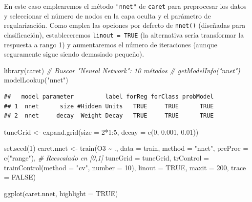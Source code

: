 \documentclass[
]{book}
\newenvironment{Shaded}{\begin{snugshade}}{\end{snugshade}}
\newcommand{\AttributeTok}[1]{\textcolor[rgb]{0.77,0.63,0.00}{#1}}
\newcommand{\CommentTok}[1]{\textcolor[rgb]{0.56,0.35,0.01}{\textit{#1}}}
\newcommand{\ConstantTok}[1]{\textcolor[rgb]{0.00,0.00,0.00}{#1}}
\newcommand{\DecValTok}[1]{\textcolor[rgb]{0.00,0.00,0.81}{#1}}
\newcommand{\FloatTok}[1]{\textcolor[rgb]{0.00,0.00,0.81}{#1}}
\newcommand{\FunctionTok}[1]{\textcolor[rgb]{0.00,0.00,0.00}{#1}}
\newcommand{\NormalTok}[1]{#1}
\newcommand{\OtherTok}[1]{\textcolor[rgb]{0.56,0.35,0.01}{#1}}
\newcommand{\SpecialCharTok}[1]{\textcolor[rgb]{0.00,0.00,0.00}{#1}}
\newcommand{\StringTok}[1]{\textcolor[rgb]{0.31,0.60,0.02}{#1}}
\theoremstyle{break}
\theoremstyle{definition}
\theoremstyle{definition}
\theoremstyle{definition}
\theoremstyle{definition}
\theoremstyle{remark}
\begin{document}
En este caso emplearemos el método \texttt{"nnet"} de \texttt{caret} para preprocesar los datos y seleccionar el número de nodos en la capa oculta y el parámetro de regularización.
Como emplea las opciones por defecto de \texttt{nnet()} (diseñadas para clasificación),
estableceremos \texttt{linout\ =\ TRUE} (la alternativa sería transformar la respuesta a rango 1) y aumentaremos el número de iteraciones (aunque seguramente sigue siendo demasiado pequeño).

\begin{Shaded}
\begin{Highlighting}[]
\FunctionTok{library}\NormalTok{(caret)}
\CommentTok{\# Buscar "Neural Network": 10 métodos}
\CommentTok{\# getModelInfo("nnet")}
\FunctionTok{modelLookup}\NormalTok{(}\StringTok{"nnet"}\NormalTok{)}
\end{Highlighting}
\end{Shaded}

\begin{verbatim}
##   model parameter         label forReg forClass probModel
## 1  nnet      size #Hidden Units   TRUE     TRUE      TRUE
## 2  nnet     decay  Weight Decay   TRUE     TRUE      TRUE
\end{verbatim}

\begin{Shaded}
\begin{Highlighting}[]
\NormalTok{tuneGrid }\OtherTok{\textless{}{-}} \FunctionTok{expand.grid}\NormalTok{(}\AttributeTok{size =} \DecValTok{2}\SpecialCharTok{*}\DecValTok{1}\SpecialCharTok{:}\DecValTok{5}\NormalTok{, }\AttributeTok{decay =} \FunctionTok{c}\NormalTok{(}\DecValTok{0}\NormalTok{, }\FloatTok{0.001}\NormalTok{, }\FloatTok{0.01}\NormalTok{))}

\FunctionTok{set.seed}\NormalTok{(}\DecValTok{1}\NormalTok{)}
\NormalTok{caret.nnet }\OtherTok{\textless{}{-}} \FunctionTok{train}\NormalTok{(O3 }\SpecialCharTok{\textasciitilde{}}\NormalTok{ ., }\AttributeTok{data =}\NormalTok{ train, }\AttributeTok{method =} \StringTok{"nnet"}\NormalTok{,}
             \AttributeTok{preProc =} \FunctionTok{c}\NormalTok{(}\StringTok{"range"}\NormalTok{), }\CommentTok{\# Reescalado en [0,1]}
             \AttributeTok{tuneGrid =}\NormalTok{ tuneGrid,}
             \AttributeTok{trControl =} \FunctionTok{trainControl}\NormalTok{(}\AttributeTok{method =} \StringTok{"cv"}\NormalTok{, }\AttributeTok{number =} \DecValTok{10}\NormalTok{), }
             \AttributeTok{linout =} \ConstantTok{TRUE}\NormalTok{, }\AttributeTok{maxit =} \DecValTok{200}\NormalTok{, }\AttributeTok{trace =} \ConstantTok{FALSE}\NormalTok{)}

\FunctionTok{ggplot}\NormalTok{(caret.nnet, }\AttributeTok{highlight =} \ConstantTok{TRUE}\NormalTok{)}
\end{Highlighting}
\end{Shaded}
\end{document}
